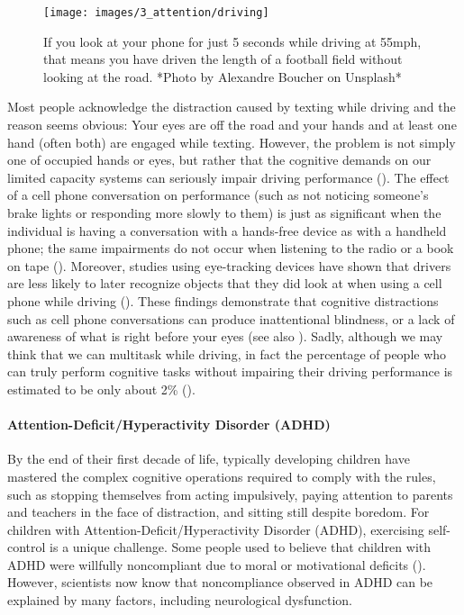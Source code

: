 \documentclass[
]{krantz}
\begin{document}
\begin{figure}

{\centering \texttt{[image: images/3\_attention/driving]} 

}

\caption{If you look at your phone for just 5 seconds while driving at 55mph, that means you have driven the length of a football field without looking at the road. *Photo by Alexandre Boucher on Unsplash*}\label{fig:driving}
\end{figure}

Most people acknowledge the distraction caused by texting while driving and the reason seems obvious: Your eyes are off the road and your hands and at least one hand (often both) are engaged while texting. However, the problem is not simply one of occupied hands or eyes, but rather that the cognitive demands on our limited capacity systems can seriously impair driving performance (). The effect of a cell phone conversation on performance (such as not noticing someone's brake lights or responding more slowly to them) is just as significant when the individual is having a conversation with a hands-free device as with a handheld phone; the same impairments do not occur when listening to the radio or a book on tape (). Moreover, studies using eye-tracking devices have shown that drivers are less likely to later recognize objects that they did look at when using a cell phone while driving (). These findings demonstrate that cognitive distractions such as cell phone conversations can produce inattentional blindness, or a lack of awareness of what is right before your eyes (see also ). Sadly, although we may think that we can multitask while driving, in fact the percentage of people who can truly perform cognitive tasks without impairing their driving performance is estimated to be only about 2\% ().

\paragraph*{Attention-Deficit/Hyperactivity Disorder (ADHD)}\label{attention-deficithyperactivity-disorder-adhd}

By the end of their first decade of life, typically developing children have mastered the complex cognitive operations required to comply with the rules, such as stopping themselves from acting impulsively, paying attention to parents and teachers in the face of distraction, and sitting still despite boredom. For children with Attention-Deficit/Hyperactivity Disorder (ADHD), exercising self-control is a unique challenge. Some people used to believe that children with ADHD were willfully noncompliant due to moral or motivational deficits (). However, scientists now know that noncompliance observed in ADHD can be explained by many factors, including neurological dysfunction.
\end{document}
